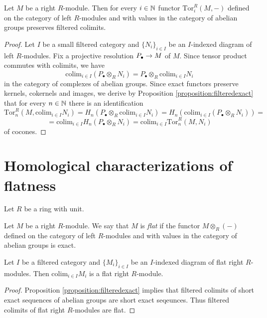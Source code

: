 \begin{corollary}\label{corollary:torpreservesfiltered}
Let $M$ be a right $R$-module. Then for every $i\in {\mathbb N}$ functor $\mathrm{Tor}^R_i(M,-)$ defined on the category of left $R$-modules and with values in the category of abelian groups preserves filtered colimits.
\end{corollary}
\begin{proof}
Let $I$ be a small filtered category and $\{N_i\}_{i\in I}$ be an $I$-indexed diagram of left $R$-modules. Fix a projective resolution $P_{\bullet}\rightarrow M$ of $M$. Since tensor product commutes with colimits, we have 
$$\mathrm{colim}_{i\in I}\left(P_{\bullet}\otimes_RN_i\right)=P_{\bullet}\otimes_R\mathrm{colim}_{i\in I}N_i$$
in the category of complexes of abelian groups. Since exact functors preserve kernels, cokernels and images, we derive by Proposition \ref{proposition:filteredexact} that for every $n\in {\mathbb N}$ there is an identification
$$\mathrm{Tor}^R_n\left(M,\mathrm{colim}_{i\in I}N_i\right)=H_n\left(P_{\bullet}\otimes_R\mathrm{colim}_{i\in I}N_i\right)=H_n\left(\mathrm{colim}_{i\in I}\left(P_{\bullet}\otimes_RN_i\right)\right)=$$
$$=\mathrm{colim}_{i\in I}H_n\left(P_{\bullet}\otimes_RN_i\right)=\mathrm{colim}_{i\in I}\mathrm{Tor}^R_n\left(M,N_i\right)$$
of cocones.
\end{proof}

\section{Homological characterizations of flatness}
\noindent
Let $R$ be a ring with unit.

\begin{definition}
Let $M$ be a right $R$-module. We say that $M$ is \textit{flat} if the functor $M\otimes_R(-)$ defined on the category of left $R$-modules and with values in the category of abelian groups is exact.
\end{definition}

\begin{proposition}\label{proposition:flatcolimits}
Let $I$ be a filtered category and $\{M_i\}_{i\in I}$ be an $I$-indexed diagram of flat right $R$-modules. Then $\mathrm{colim}_{i\in I}M_i$ is a flat right $R$-module.
\end{proposition}
\begin{proof}
Proposition \ref{proposition:filteredexact} implies that filtered colimits of short exact sequences of abelian groups are short exact seqeunces. Thus filtered colimits of flat right $R$-modules are flat.
\end{proof}

